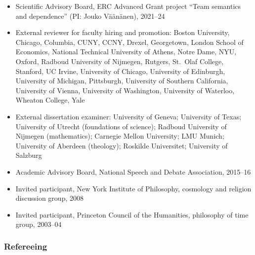 \documentclass[11pt]{article}
\newcommand{\rubric}[1]{\subsubsection*{#1}}
\begin{document}
\begin{itemize}
\item Scientific Advisory Board, ERC Advanced Grant project ``Team semantics
  and dependence'' (PI: Jouko V{\"a}{\"a}n{\"a}nen), 2021--24
\item External reviewer for faculty hiring and promotion: Boston University,
  Chicago, Columbia, CUNY, CCNY, Drexel, Georgetown, London School of
  Economics, National Technical University of Athens, Notre Dame, NYU, Oxford,
  Radboud University of Nijmegen, Rutgers, St.\ Olaf College, Stanford, UC
  Irvine, University of Chicago, University of Edinburgh, University of
  Michigan, Pittsburgh, University of Southern California, University of
  Vienna, University of Washington, University of Waterloo, Wheaton College,
  Yale
\item External dissertation examiner: University of Geneva; University of
  Texas; University of Utrecht (foundations of science); Radboud University of
  Nijmegen (mathematics); Carnegie Mellon University; LMU Munich; University
  of Aberdeen (theology); Roskilde Universitet; University of Salzburg
\item Academic Advisory Board, National Speech and Debate Association, 2015--16
\item Invited participant, New York Institute of Philosophy, cosmology and
  religion discussion group, 2008
\item Invited participant, Princeton Council of the Humanities, philosophy of
  time group, 2003--04
\end{itemize}

\rubric{Refereeing}
\end{document}
